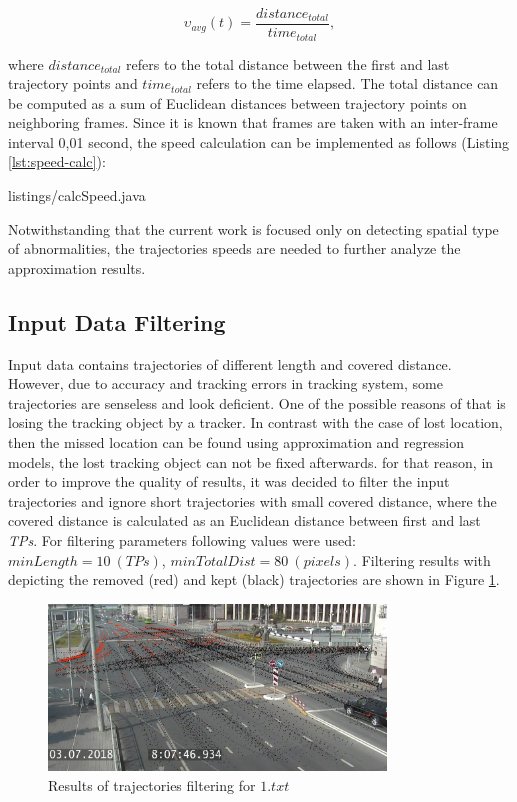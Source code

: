 \begin{equation} \label{eq:avg_speed}
	\upsilon_{avg}(t) = \frac{distance_{total}} {time_{total}},
\end{equation}

where $distance_{total}$ refers to the total distance between the first and last trajectory points and $time_{total}$ refers to the time elapsed. The total distance can be computed as a sum of Euclidean distances between trajectory points on neighboring frames. Since it is known that frames are taken with an inter-frame interval 0,01 second, the speed calculation can be implemented as follows (Listing \ref{lst:speed-calc}):

\lstset{style=code-style-java}
 {listings/calcSpeed.java}

Notwithstanding that the current work is focused only on detecting spatial type of abnormalities, the trajectories speeds are needed to further analyze the approximation results.

\subsection{Input Data Filtering}

Input data contains trajectories of different length and covered distance. However, due to accuracy and tracking errors in tracking system, some trajectories are senseless and look deficient. One of the possible reasons of that is losing the tracking object by a tracker. In contrast with the case of lost location, then the missed location can be found using approximation and regression models, the lost tracking object can not be fixed afterwards. for that reason, in order to improve the quality of results, it was decided to filter the input trajectories and ignore short trajectories with small covered distance, where the covered distance is calculated as an Euclidean distance between first and last \textit{TPs}. For filtering parameters following values were used: $minLength = 10\ (TPs)$, $minTotalDist = 80\ (pixels)$. Filtering results with depicting the removed (red) and kept (black) trajectories are shown in Figure \ref{fig:traj_filter}.

\begin{figure}[!htb]
	\centering{}
	\includegraphics[width=0.8\textwidth]{images/traj-filter-res.jpeg}
	\caption{Results of trajectories filtering for $1.txt$}
	\label{fig:traj_filter}
\end{figure}

